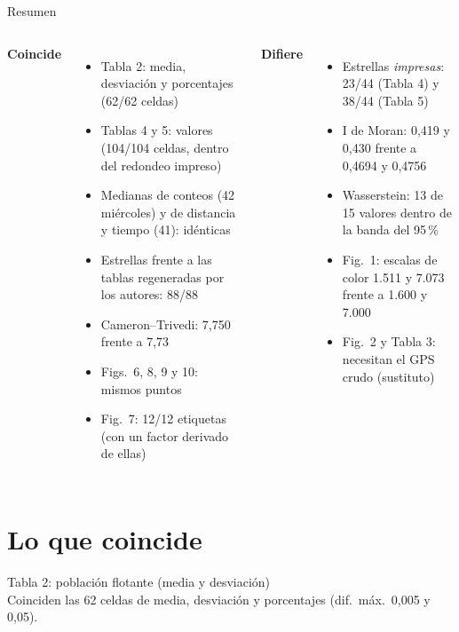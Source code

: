 \documentclass[aspectratio=169,10pt,t]{beamer}
\begin{document}
\begin{frame}{Resumen}
  \begin{columns}[T]
    \textbf{Coincide}
    \footnotesize
    \begin{itemize}
      \item Tabla 2: media, desviación y porcentajes (62/62 celdas)
      \item Tablas 4 y 5: valores (104/104 celdas, dentro del redondeo impreso)
      \item Medianas de conteos (42 miércoles) y de distancia y tiempo (41): idénticas
      \item Estrellas frente a las tablas regeneradas por los autores: 88/88
      \item Cameron--Trivedi: 7,750 frente a 7,73
      \item Figs.\ 6, 8, 9 y 10: mismos puntos
      \item Fig.\ 7: 12/12 etiquetas (con un factor derivado de ellas)
    \end{itemize}
    \textbf{Difiere}
    \footnotesize
    \begin{itemize}
      \item Estrellas \emph{impresas}: 23/44 (Tabla 4) y 38/44 (Tabla 5)
      \item I de Moran: 0,419 y 0,430 frente a 0,4694 y 0,4756
      \item Wasserstein: 13 de 15 valores dentro de la banda del 95\,\%
      \item Fig.\ 1: escalas de color 1.511 y 7.073 frente a 1.600 y 7.000
      \item Fig.\ 2 y Tabla 3: necesitan el GPS crudo (sustituto)
    \end{itemize}
  \end{columns}
\end{frame}

\section{Lo que coincide}

\begin{frame}{Tabla 2: población flotante (media y desviación)}
  \centering\footnotesize
  \\[2pt]
  \footnotesize Coinciden las 62 celdas de media, desviación y porcentajes (dif.\ máx.\ 0,005 y 0,05).
\end{frame}
\end{document}
